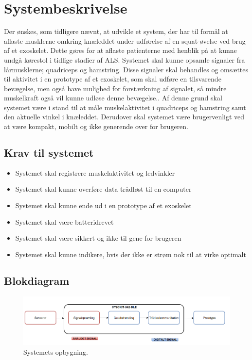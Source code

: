 \section{Systembeskrivelse}
Der ønskes, som tidligere nævnt, at udvikle et system, der har til formål at aflaste musklerne omkring knæleddet under udførelse af en squat-øvelse ved brug af et exoskelet. Dette gøres for at aflaste patienterne med henblik på at kunne undgå kørestol i tidlige stadier af ALS. Systemet skal kunne opsamle signaler fra lårmusklerne; quadriceps og hamstring. Disse signaler skal behandles og omsættes til aktivitet i en prototype af et exoskelet, som skal udføre en tilsvarende bevægelse, men også have mulighed for forstærkning af signalet, så mindre muskelkraft også vil kunne udløse denne bevægelse.. Af denne grund skal systemet være i stand til at måle muskelaktivitet i quadriceps og hamstring samt den aktuelle vinkel i knæleddet. Derudover skal systemet være brugervenligt ved at være kompakt, mobilt og ikke generende over for brugeren.

\subsection{Krav til systemet} 
\begin{itemize}
\item Systemet skal registrere muskelaktivitet og ledvinkler
\item Systemet skal kunne overføre data trådløst til en computer
\item Systemet skal kunne ende ud i en prototype af et exoskelet
\item Systemet skal være batteridrevet
\item Systemet skal være sikkert og ikke til gene for brugeren
\item Systemet skal kunne indikere, hvis der ikke er strøm nok til at virke optimalt
\end{itemize}


\subsection{Blokdiagram}
\begin{figure}[H]
\centering
\includegraphics[width=1\textwidth]{figures/blokdiagram.png}
\caption{Systemets opbygning.}
\label{fig:blokdiagram}
\end{figure}

